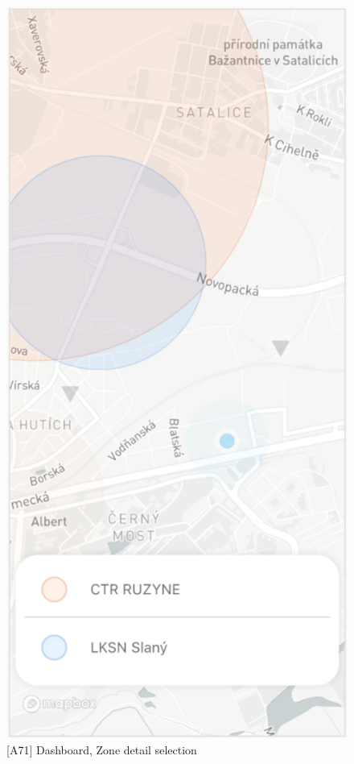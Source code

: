 \begin{figure}
    \centering
    \begin{minipage}{.45\textwidth}
        \centering
        \includegraphics[width=.7\linewidth]{assets/user_interface_design/dashboard/dashboard_zone_selection.png}
        \caption{[A71] Dashboard, Zone detail selection}
        \label{fig:dashboard_zone_detail_selection}
    \end{minipage}%
    \hspace{.05\linewidth}
    \begin{minipage}{.45\textwidth}
        \centering

\end{minipage}
\end{figure}
